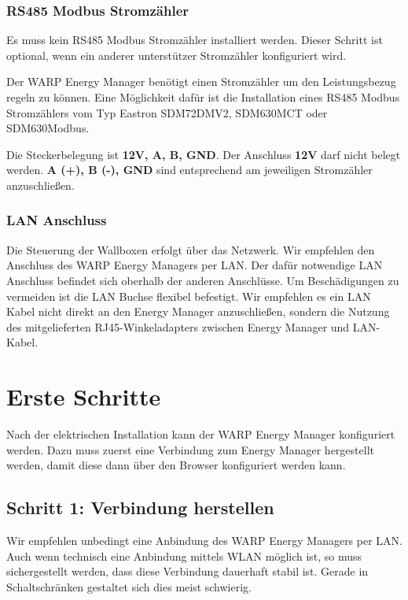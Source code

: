 \documentclass[a4paper,10pt]{article}
\newcommand{\hint}[1]{\begin{tcolorbox}[colback=boxgray,colframe=black,coltext=
white,title=Hinweis,left*=2mm,right*=2mm,boxsep=1mm,bottom=1mm,top=1mm]#1\end{tcolorbox}}
\begin{document}
\begin{multicols*}{2}
	\subsubsection{RS485 Modbus Stromzähler}
	\hint{Es muss kein RS485 Modbus Stromzähler installiert werden. Dieser
	Schritt ist optional, wenn ein anderer unterstützer Stromzähler konfiguriert
	wird.}

	Der WARP Energy Manager benötigt einen Stromzähler um den Leistungsbezug regeln zu 
	können. Eine Möglichkeit dafür ist die Installation eines RS485 Modbus
	Stromzählers vom Typ Eastron SDM72DMV2, SDM630MCT oder SDM630Modbus.
	
	Die Steckerbelegung ist \textbf{12V, A, B, GND}. Der Anschluss \textbf{12V}
	darf nicht belegt werden. \textbf{A (+), B (-), GND} sind entsprechend 
	am jeweiligen Stromzähler anzuschließen.

	\subsubsection{LAN Anschluss}
	Die Steuerung der Wallboxen erfolgt über das Netzwerk. Wir empfehlen den
	Anschluss des WARP Energy Managers per LAN. Der dafür notwendige LAN
	Anschluss befindet sich oberhalb der anderen Anschlüsse. Um Beschädigungen
	zu vermeiden ist die LAN Buchse flexibel befestigt. Wir empfehlen es ein LAN
	Kabel nicht direkt an den Energy Manager anzuschließen, sondern die Nutzung 
	des mitgelieferten RJ45-Winkeladapters zwischen Energy Manager und
	LAN-Kabel.

	\newpage
	\section{Erste Schritte}
	\label{setup}

	Nach der elektrischen Installation kann der WARP Energy Manager konfiguriert
	werden. Dazu muss zuerst eine Verbindung zum Energy Manager hergestellt werden, 
	damit diese dann über den Browser konfiguriert werden kann.

	\subsection{Schritt 1: Verbindung herstellen}


	\hint{Wir empfehlen unbedingt eine Anbindung des WARP Energy Managers per
	LAN. Auch wenn technisch eine Anbindung mittels WLAN möglich ist, so muss
	sichergestellt werden, dass diese Verbindung dauerhaft stabil ist. Gerade in
	Schaltschränken gestaltet sich dies meist schwierig.}


\end{multicols*}
\end{document}
